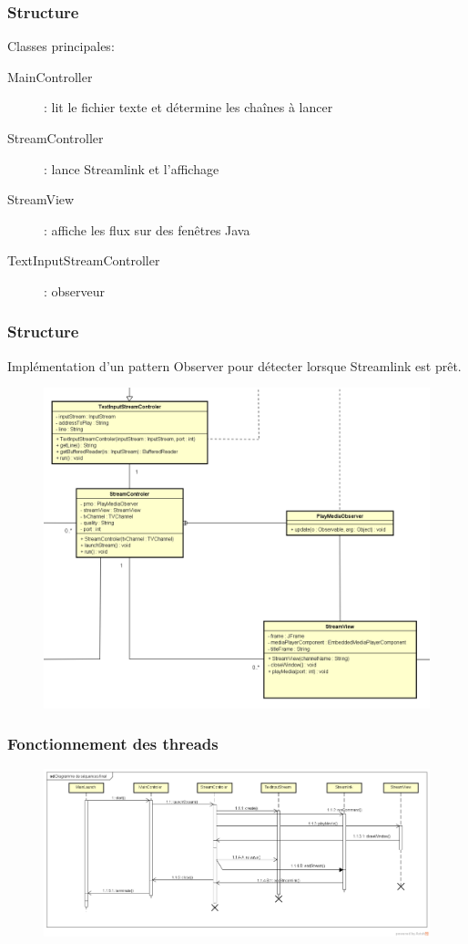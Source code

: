 \documentclass{beamer}
\begin{document}
\begin{frame}
\frametitle{Structure}

Classes principales:
\begin{description}
	\item[MainController] : lit le fichier texte et détermine les chaînes à lancer
	\item[StreamController] : lance Streamlink et l'affichage
	\item[StreamView] : affiche les flux sur des fenêtres Java
	\item[TextInputStreamController] : observeur
\end{description}

\end{frame}

\begin{frame}
\frametitle{Structure}

Implémentation d'un pattern Observer pour détecter lorsque Streamlink est prêt. 

\begin{figure}
	\includegraphics[scale=0.25]{images/ObserverDiag}
\end{figure}

\end{frame}


\begin{frame}
\frametitle{Fonctionnement des threads}

\begin{figure}
	\includegraphics[scale=0.25]{images/seqdiag}
\end{figure}

\end{frame}
\end{document}
